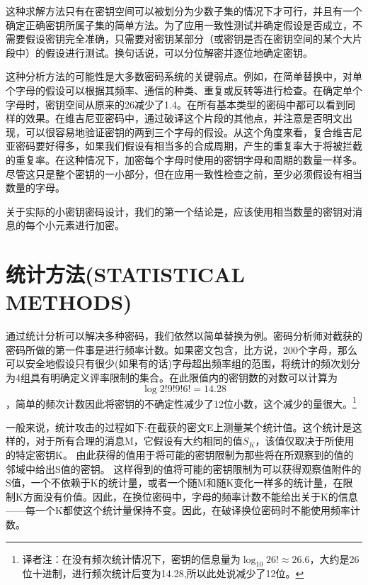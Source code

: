 \documentclass[]{article}
\begin{document}
这种求解方法只有在密钥空间可以被划分为少数子集的情况下才可行，并且有一个确定正确密钥所属子集的简单方法。为了应用一致性测试并确定假设是否成立，不需要假设密钥完全准确，只需要对密钥某部分（或密钥是否在密钥空间的某个大片段中）的假设进行测试。换句话说，可以分位解密并逐位地确定密钥。

这种分析方法的可能性是大多数密码系统的关键弱点。例如，在简单替换中，对单个字母的假设可以根据其频率、通信的种类、重复或反转等进行检查。在确定单个字母时，密钥空间从原来的26减少了1.4。在所有基本类型的密码中都可以看到同样的效果。在维吉尼亚密码中，通过破译这个片段的其他点，并注意是否明文出现，可以很容易地验证密钥的两到三个字母的假设。从这个角度来看，复合维吉尼亚密码要好得多，如果我们假设有相当多的合成周期，产生的重复率大于将被拦截的重复率。在这种情况下，加密每个字母时使用的密钥字母和周期的数量一样多。尽管这只是整个密钥的一小部分，但在应用一致性检查之前，至少必须假设有相当数量的字母。

关于实际的小密钥密码设计，我们的第一个结论是，应该使用相当数量的密钥对消息的每个小元素进行加密。

\newpage
%   
%

\section{统计方法(STATISTICAL METHODS)}

通过统计分析可以解决多种密码，我们依然以简单替换为例。密码分析师对截获的密码所做的第一件事是进行频率计数。如果密文包含，比方说，200个字母，那么可以安全地假设只有很少(如果有的话)字母超出频率组的范围，将统计的频次划分为4组具有明确定义评率限制的集合。在此限值内的密钥数的对数可以计算为
\[\log{2!9!9!6!}=14.28\]
，简单的频次计数因此将密钥的不确定性减少了12位小数，这个减少的量很大。\footnote{译者注：在没有频次统计情况下，密钥的信息量为$\log_{10}{26!}\approx 26.6$，大约是26位十进制，进行频次统计后变为14.28,所以此处说减少了12位。}

一般来说，统计攻击的过程如下:在截获的密文E上测量某个统计值。这个统计是这样的，对于所有合理的消息M，它假设有大约相同的值$S_K$，该值仅取决于所使用的特定密钥K。
由此获得的值用于将可能的密钥限制为那些将在所观察到的值的邻域中给出S值的密钥。
这样得到的值将可能的密钥限制为可以获得观察值附件的S值，一个不依赖于K的统计量，或者一个随M和随K变化一样多的统计量，在限制K方面没有价值。因此，在换位密码中，字母的频率计数不能给出关于K的信息——每一个K都使这个统计量保持不变。因此，在破译换位密码时不能使用频率计数。
\end{document}
